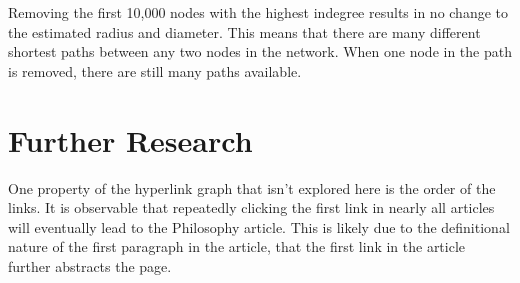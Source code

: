 \documentclass{article}
\begin{document}
Removing the first 10,000 nodes with the highest indegree results in no change to the estimated radius and diameter. 
This means that there are many different shortest paths between any two nodes in the network. When one node in the path is removed, there are still many paths available.

\section{Further Research}

One property of the hyperlink graph that isn't explored here is the order of the links. It is observable that repeatedly clicking the first link in nearly all articles will eventually lead to the Philosophy article. This is likely due to the definitional nature of the first paragraph in the article, that the first link in the article further abstracts the page.


\printbibliography
\end{document}
